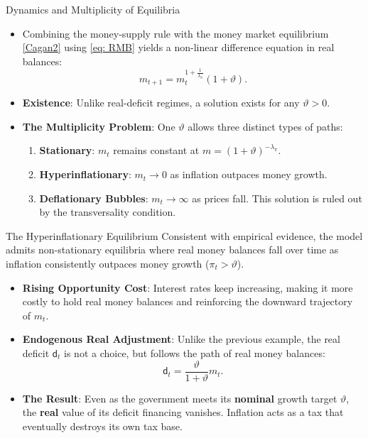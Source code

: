 \documentclass[11pt,aspectratio=169]{beamer}
\begin{document}
\begin{frame}{Dynamics and Multiplicity of Equilibria}
\small
\begin{itemize}
    \item Combining the money-supply rule with the money market equilibrium \eqref{Cagan2} using \eqref{eq: RMB} yields a non-linear difference equation in real balances:
    \[
        m_{t+1}=m_{t}^{1+\frac{1}{\lambda _{\pi }}}(1+\vartheta ). \label{eq: RMB_Nom}
    \]
    \item \textbf{Existence}: Unlike real-deficit regimes, a solution exists for any $\vartheta > 0$. 
    \item \textbf{The Multiplicity Problem}: One $\vartheta$ allows three distinct types of paths:
    \begin{enumerate}
        \item \textbf{Stationary}: $m_t$ remains constant at $m = (1+\vartheta)^{-\lambda_{\pi}}$.
        \item \textbf{Hyperinflationary}: $m_t \to 0$ as inflation outpaces money growth.
        \item \textbf{Deflationary Bubbles}: $m_t \to \infty$ as prices fall. This solution is ruled out by the transversality condition.
    \end{enumerate}
\end{itemize}
\end{frame}


\begin{frame}{The Hyperinflationary Equilibrium}
\small
Consistent with empirical evidence, the model admits non-stationary equilibria where real money balances fall over time as inflation consistently outpaces money growth ($\pi_t > \vartheta$).

\vspace{0.2cm}
\begin{itemize}
    \item \textbf{Rising Opportunity Cost}: Interest rates keep increasing, making it more costly to hold real money balances and reinforcing the downward trajectory of $m_t$.
    
    \item \textbf{Endogenous Real Adjustment}: Unlike the previous example, the real deficit $\mathsf{d}_t$ is not a choice, but follows the path of real money balances:
    \begin{equation*}
    \mathsf{d}_{t}=\frac{\vartheta }{1+\vartheta }m_{t}.
    \end{equation*}
    
    \item \textbf{The Result}: Even as the government meets its \textbf{nominal} growth target $\vartheta$, the \textbf{real} value of its deficit financing vanishes. Inflation acts as a tax that eventually destroys its own tax base.
\end{itemize}
\end{frame}
\end{document}
